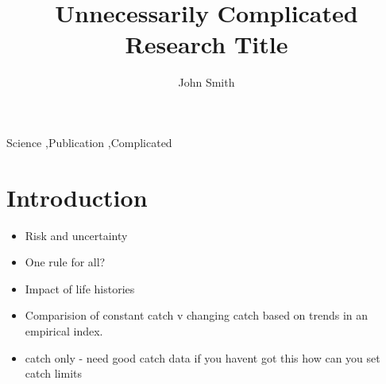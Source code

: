 \documentclass[preprint,12pt]{elsarticle}
\begin{document}
\begin{frontmatter}


\title{Unnecessarily Complicated Research Title}




\author{John Smith}

\address{California, United States}

\begin{abstract}

\end{abstract}

\begin{keyword}
Science \sep Publication \sep Complicated


\end{keyword}

\end{frontmatter}

\linenumbers

\section{Introduction}
\label{S:1}

\begin{itemize}
\item Risk and uncertainty
\item One rule for all?
\item Impact of life histories
\item Comparision of constant catch v changing catch based on trends in an empirical index. 
\item catch only - need good catch data if you havent got this how can you set catch limits
\end{itemize}
\end{document}
